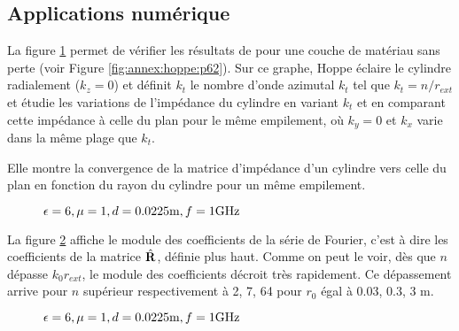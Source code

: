   \subsection{Applications numérique}

    La figure \ref{fig:imp_fourier:cylindre:hoppe_p62:converge_rayon} permet de vérifier les résultats de \cite[p.~62]{hoppe_impedance_1995} pour une couche de matériau sans perte (voir Figure \ref{fig:annex:hoppe:p62}). Sur ce graphe, Hoppe éclaire le cylindre radialement (\(k_z=0\)) et définit \(k_t\) le nombre d'onde azimutal \(k_t\) tel que \(k_t = n \slash r_{ext}\) et étudie les variations de l'impédance du cylindre en variant \(k_t\) et en comparant cette impédance à celle du plan pour le même empilement, où \(k_y = 0\) et \(k_x\) varie dans la même plage que \(k_t\).

    Elle montre la convergence de la matrice d'impédance d'un cylindre vers celle du plan en fonction du rayon du cylindre pour un même empilement. 
    \begin{figure}[!hbt]
      \centering
      
      \caption{\(\epsilon = 6, \mu = 1, d=0.0225\text{m}, f=1\text{GHz}\)}
      \label{fig:imp_fourier:cylindre:hoppe_p62:converge_rayon}
    \end{figure}

    La figure \ref{fig:imp_fourier:cylindre:hoppe_p62:coeff_fourier} affiche le module des coefficients de la série de Fourier, c'est à dire les coefficients de la matrice \(\hat{\mathbf{R}}\), définie plus haut. Comme on peut le voir, dès que \(n\) dépasse \(k_0r_{ext}\), le module des coefficients décroit très rapidement. Ce dépassement arrive pour \(n\) supérieur respectivement à 2, 7, 64 pour \(r_0\) égal à 0.03, 0.3, 3 m.

    \begin{figure}[!hbt]
      \centering
      
      \caption{\(\epsilon = 6, \mu = 1, d=0.0225\text{m}, f=1\text{GHz}\)}
      \label{fig:imp_fourier:cylindre:hoppe_p62:coeff_fourier}
    \end{figure}